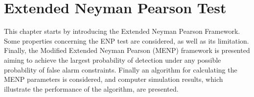 \chapter{Extended Neyman Pearson Test}

\newcommand{\bom}{\boldsymbol{\omega}}
This chapter starts by introducing the Extended Neyman Pearson Framework. Some properties concerning the ENP test are considered, as well as its limitation. Finally, the Modified Extended Neyman Pearson (MENP) framework is presented aiming to achieve the largest probability of detection under any possible probability of false alarm constraints. Finally an algorithm for calculating the MENP parameters is considered, and  computer simulation results, which illustrate the performance of the algorithm, are presented. 

\typeout{}


\typeout{}


\typeout{}


\typeout{}


\typeout{}

                     
